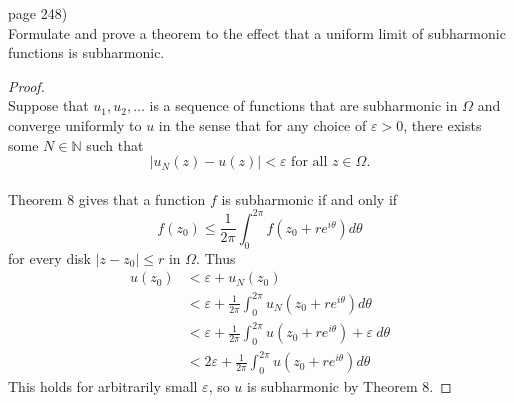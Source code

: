 \documentclass{article}
\newenvironment{problem}[2][Problem]{\begin{trivlist}
\item[\hskip \labelsep {\bfseries #1}\hskip \labelsep {\bfseries #2.}]}{\end{trivlist}}
\begin{document}
\begin{problem}{5} (page 248) \\
  Formulate and prove a theorem to the effect that a uniform limit of
  subharmonic functions is subharmonic.
\end{problem}

\begin{proof} \text{} \\
  Suppose that $u_1, u_2, \hdots$ is a sequence of functions that are
  subharmonic in $\Omega$ and converge uniformly to $u$ in the sense that for
  any choice of $\varepsilon > 0$, there
  exists some $N \in \mathbb{N}$ such that \[
    |u_N(z) - u(z)| < \varepsilon \text{ for all } z \in \Omega.
  \]\\
  Theorem 8 gives that a function $f$ is subharmonic if and only if \[
    f(z_{0}) \leq \frac{1}{2\pi} \int_{0}^{2\pi} f \left(z_{0} + re^{i\theta}\right) d\theta
  \] for every disk $|z - z_0| \leq r$ in $\Omega$.
  Thus \begin{align*}
    u(z_0) &< \varepsilon + u_N(z_0)\\
    &< \varepsilon + \frac{1}{2\pi} \int_{0}^{2\pi} u_N\left(z_{0} + re^{i\theta}\right) d\theta\\
    &< \varepsilon + \frac{1}{2\pi} \int_{0}^{2\pi} u\left(z_{0} + re^{i\theta}\right) + \varepsilon\ d\theta\\
    &< 2\varepsilon + \frac{1}{2\pi} \int_{0}^{2\pi} u\left(z_{0} + re^{i\theta}\right) d\theta
  \end{align*}
  This holds for arbitrarily small $\varepsilon$, so $u$ is subharmonic by Theorem 8.

\end{proof}
\end{document}
